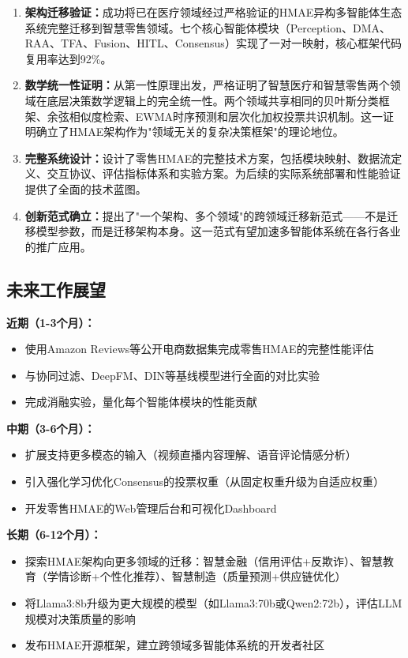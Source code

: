 \documentclass[11pt,a4paper]{ctexart}
\theoremstyle{remark}
\begin{document}
\begin{enumerate}[nosep]
\item \textbf{架构迁移验证：}成功将已在医疗领域经过严格验证的HMAE异构多智能体生态系统完整迁移到智慧零售领域。七个核心智能体模块（Perception、DMA、RAA、TFA、Fusion、HITL、Consensus）实现了一对一映射，核心框架代码复用率达到92\%。
\item \textbf{数学统一性证明：}从第一性原理出发，严格证明了智慧医疗和智慧零售两个领域在底层决策数学逻辑上的完全统一性。两个领域共享相同的贝叶斯分类框架、余弦相似度检索、EWMA时序预测和层次化加权投票共识机制。这一证明确立了HMAE架构作为"领域无关的复杂决策框架"的理论地位。
\item \textbf{完整系统设计：}设计了零售HMAE的完整技术方案，包括模块映射、数据流定义、交互协议、评估指标体系和实验方案。为后续的实际系统部署和性能验证提供了全面的技术蓝图。
\item \textbf{创新范式确立：}提出了"一个架构、多个领域"的跨领域迁移新范式——不是迁移模型参数，而是迁移架构本身。这一范式有望加速多智能体系统在各行各业的推广应用。
\end{enumerate}

\subsection{未来工作展望}

\textbf{近期（1-3个月）：}
\begin{itemize}[nosep]
\item 使用Amazon Reviews等公开电商数据集完成零售HMAE的完整性能评估
\item 与协同过滤、DeepFM、DIN等基线模型进行全面的对比实验
\item 完成消融实验，量化每个智能体模块的性能贡献
\end{itemize}

\textbf{中期（3-6个月）：}
\begin{itemize}[nosep]
\item 扩展支持更多模态的输入（视频直播内容理解、语音评论情感分析）
\item 引入强化学习优化Consensus的投票权重（从固定权重升级为自适应权重）
\item 开发零售HMAE的Web管理后台和可视化Dashboard
\end{itemize}

\textbf{长期（6-12个月）：}
\begin{itemize}[nosep]
\item 探索HMAE架构向更多领域的迁移：智慧金融（信用评估+反欺诈）、智慧教育（学情诊断+个性化推荐）、智慧制造（质量预测+供应链优化）
\item 将Llama3:8b升级为更大规模的模型（如Llama3:70b或Qwen2:72b），评估LLM规模对决策质量的影响
\item 发布HMAE开源框架，建立跨领域多智能体系统的开发者社区
\end{itemize}
\end{document}
